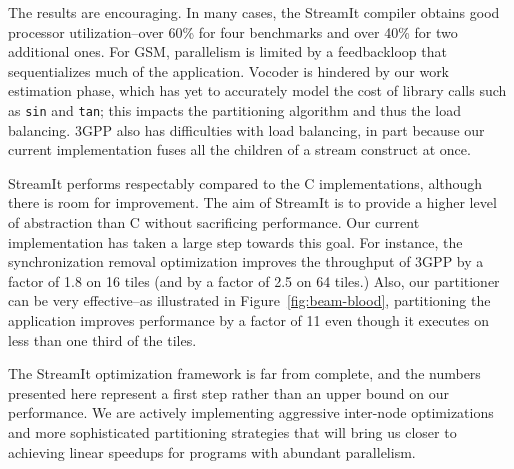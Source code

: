 The results are encouraging.  In many cases, the StreamIt compiler
obtains good processor utilization--over 60\% for four benchmarks and
over 40\% for two additional ones.  For GSM, parallelism is limited by
a feedbackloop that sequentializes much of the application.  Vocoder
is hindered by our work estimation phase, which has yet to accurately
model the cost of library calls such as {\tt sin} and {\tt tan}; this
impacts the partitioning algorithm and thus the load balancing.  3GPP
also has difficulties with load balancing, in part because our current
implementation fuses all the children of a stream construct at once.

StreamIt performs respectably compared to the C implementations,
although there is room for improvement.  The aim of StreamIt is to
provide a higher level of abstraction than C without sacrificing
performance.  Our current implementation has taken a large step
towards this goal.  For instance, the synchronization removal
optimization improves the throughput of 3GPP by a factor of 1.8 on 16
tiles (and by a factor of 2.5 on 64 tiles.)  Also, our partitioner can
be very effective--as illustrated in Figure~\ref{fig:beam-blood},
partitioning the \Radar~ application improves performance by a factor
of 11 even though it executes on less than one third of the tiles.

The StreamIt optimization framework is far from complete, and the
numbers presented here represent a first step rather than an upper
bound on our performance.  We are actively implementing aggressive
inter-node optimizations and more sophisticated partitioning
strategies that will bring us closer to achieving linear speedups for
programs with abundant parallelism.



